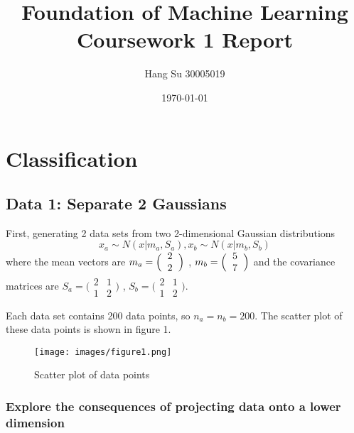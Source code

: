 \documentclass[a4paper, 12pt]{article}
\title{Foundation of Machine Learning Coursework 1 Report}
\author{Hang Su  30005019}
\date{\today}
\begin{document}
\linespread{1.5}
\maketitle

\section{Classification}
\label{sec:Classification}

\subsection{Data 1: Separate 2 Gaussians}

First, generating 2 data sets from two 2-dimensional Gaussian distributions
\begin{equation*}
    x_a \sim N(x|m_a,S_a), x_b \sim N(x|m_b, S_b)
\end{equation*}
where the mean vectors are
$m_a =  
\Big( 
\begin{tabular}{c}
     2  \\
     2
\end{tabular}
 \Big)$
 ,
$m_b =  
\Big( 
\begin{tabular}{c}
     5  \\
     7
\end{tabular}
 \Big)$
 and the covariance matrices are
 $S_a = 
 \Big(
 \begin{array}{cc}
      2 & 1 \\
      1 & 2 
 \end{array}
 \Big)$
 ,
 $S_b = 
 \Big(
 \begin{array}{cc}
      2 & 1 \\
      1 & 2 
 \end{array}
 \Big)$.


 Each data set contains 200 data points, so $n_a = n_b = 200$. The scatter plot of these data points is shown in figure 1.
 \begin{figure}[h]
  \centering
  \texttt{[image: images/figure1.png]}
  \caption{Scatter plot of data points}
 \end{figure}

    \subsubsection{Explore the consequences of projecting data onto a lower dimension}
    
\end{document}
